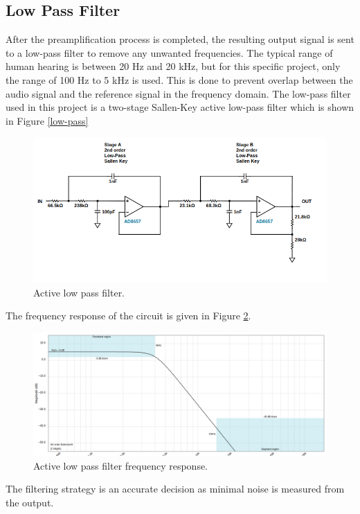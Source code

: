 \documentclass[a4paper,10pt]{IEEEtran}
\begin{document}
\subsection{Low Pass Filter}
After the preamplification process is completed, the resulting output signal is sent to a low-pass filter to remove any unwanted frequencies. The typical range of human hearing is between 20 Hz and 20 kHz, but for this specific project, only the range of 100 Hz to 5 kHz is used. This is done to prevent overlap between the audio signal and the reference signal in the frequency domain. The low-pass filter used in this project is a two-stage Sallen-Key active low-pass filter which is shown in Figure \ref{low-pass}
\begin{figure}[htbp!]
    \centering
    \includegraphics[width = 1\linewidth]{active_low_pass_circuit.png}
    \caption{Active low pass filter.}
    \label{lowpass}
\end{figure} 
The frequency response of the circuit is given in Figure \ref{lowpass_resp}.
\begin{figure}[htbp!]
    \centering
    \includegraphics[width = 1\linewidth]{active_low_pass.png}
    \caption{Active low pass filter frequency response.}
    \label{lowpass_resp}
\end{figure} 
The filtering strategy is an accurate decision as minimal noise is measured from the output. 
\end{document}
